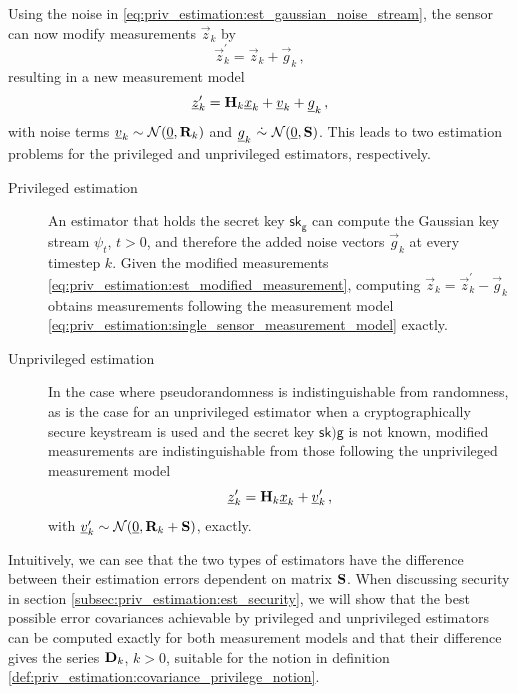 Using the noise in \eqref{eq:priv_estimation:est_gaussian_noise_stream}, the sensor can now modify measurements $\vec{z}_k$ by
\begin{equation}\label{eq:priv_estimation:est_modified_measurement}
    \vec{z}^\prime_k = \vec{z}_k + \vec{g}_k\,,
\end{equation}
resulting in a new measurement model
\begin{equation}
    {\underline{z}}^\prime_k = {{\mathbf{H}}}_k{\underline{x}}_k + {\underline{v}}_k + {\underline{g}}_k\,,
\end{equation}
with noise terms ${\underline{v}}_k\sim \mathcal{N}({\underline{0}},{{\mathbf{R}}}_k)$ and $\vec{g}_k\ \dot{\sim}\ \mathcal{N}(\vec{0},\mat{S})$. This leads to two estimation problems for the privileged and unprivileged estimators, respectively.
\begin{description}
    \item[Privileged estimation] An estimator that holds the secret key $\mathsf{sk}_{\mathsf{g}}$ can compute the Gaussian key stream $\psi_t$, $t>0$, and therefore the added noise vectors $\vec{g}_k$ at every timestep $k$. Given the modified measurements \eqref{eq:priv_estimation:est_modified_measurement}, computing $\vec{z}_k = \vec{z}^\prime_k - \vec{g}_k$  obtains measurements following the measurement model \eqref{eq:priv_estimation:single_sensor_measurement_model} exactly.
    \item[Unprivileged estimation] In the case where pseudorandomness is indistinguishable from randomness, as is the case for an unprivileged estimator when a cryptographically secure keystream is used and the secret key $\mathsf{sk}){\mathsf{g}}$ is not known, modified measurements are indistinguishable from those following the unprivileged measurement model 
    \begin{equation}\label{eq:priv_estimation:est_unpriv_measurement_model}
        {\underline{z}}^\prime_k = {{\mathbf{H}}}_k{\underline{x}}_k + {\underline{v}}^\prime_k\,,
    \end{equation}
   with ${\underline{v}}^\prime_k\sim \mathcal{N}({\underline{0}},{{\mathbf{R}}}_k+{{\mathbf{S}}})$, exactly.
\end{description}

Intuitively, we can see that the two types of estimators have the difference between their estimation errors dependent on matrix ${{\mathbf{S}}}$. When discussing security in section \ref{subsec:priv_estimation:est_security}, we will show that the best possible error covariances achievable by privileged and unprivileged estimators can be computed exactly for both measurement models and that their difference gives the series ${{\mathbf{D}}}_k$, $k>0$, suitable for the notion in definition \ref{def:priv_estimation:covariance_privilege_notion}.

